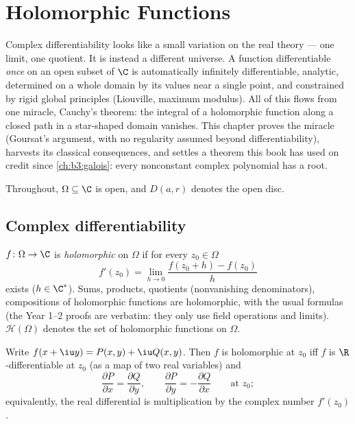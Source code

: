 \chapter{Holomorphic Functions}\label{ch:b3:holomorphic}

Complex differentiability looks like a small variation on the
real theory --- one limit, one quotient. It is instead a
different universe. A function differentiable \emph{once} on an
open subset of $\C$ is automatically infinitely differentiable,
analytic, determined on a whole domain by its values near a
single point, and constrained by rigid global principles
(Liouville, maximum modulus). All of this flows from one
miracle, Cauchy's theorem: the integral of a holomorphic
function along a closed path in a star-shaped domain vanishes.
This chapter proves the miracle (Goursat's argument, with no
regularity assumed beyond differentiability), harvests its
classical consequences, and settles a theorem this book has
used on credit since \cref{ch:b3:galois}: every nonconstant
complex polynomial has a root.

Throughout, $\Omega \subseteq \C$ is open, and $D(a, r)$
denotes the open disc.

\section{Complex differentiability}

\begin{definition}\label{def:b3:holomorphic:holo}
$f \colon \Omega \to \C$ is \emph{holomorphic} on $\Omega$ if for every $z_0 \in \Omega$
\[
f'(z_0) = \lim_{h\to0}\frac{f(z_0 + h) - f(z_0)}{h}
\]
exists ($h \in \C^*$). Sums, products, quotients (nonvanishing
denominators), compositions of holomorphic functions are
holomorphic, with the usual formulas (the Year 1--2 proofs are
verbatim: they only use field operations and limits).
$\mathcal H(\Omega)$ denotes the set of holomorphic functions
on $\Omega$.
\end{definition}

\begin{proposition}
\label{prop:b3:holomorphic:cauchyriemann}
Write $f(x + \iu y) = P(x,y) + \iu Q(x,y)$. Then $f$ is
holomorphic at $z_0$ iff $f$ is $\R$-differentiable at $z_0$
(as a map of two real variables) and
\[
\frac{\partial P}{\partial x} = \frac{\partial Q}{\partial y},
\qquad
\frac{\partial P}{\partial y} = -\frac{\partial Q}{\partial x}
\qquad \text{at } z_0 ;
\]
equivalently, the real differential is multiplication by the
complex number $f'(z_0)$.
\end{proposition}

